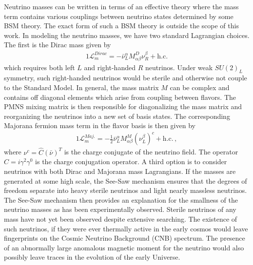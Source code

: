 \documentclass[universe,article,submit,moreauthors,pdftex,a4paper]{Definitions/mdpi}
\begin{document}
Neutrino masses can be written in terms of an effective theory where the mass term contains various couplings between neutrino states determined by some BSM theory. The exact form of such a BSM theory is outside the scope of this work. In modeling the neutrino masses, we have two standard Lagrangian choices. The first is the Dirac mass given by
\begin{alignat}{1}
	\label{DiracMass} \mathcal{L}_{m}^{Dirac} = -\bar{\nu}^{\alpha}_{L}M^{D}_{\alpha\beta}\nu^{\beta}_{R}+\mathrm{h.c.}
\end{alignat}
which requires both left $L$ and right-handed $R$ neutrinos. Under weak $SU(2)_{L}$ symmetry, such right-handed neutrinos would be sterile and otherwise not couple to the Standard Model. In general, the mass matrix $M$ can be complex and contains off diagonal elements which arise from coupling between flavors. The PMNS mixing matrix is then responsible for diagonalizing the mass matrix and reorganizing the neutrinos into a new set of basis states. The corresponding Majorana fermion mass term in the flavor basis is then given by
\begin{alignat}{1}
	\label{Majorana} \mathcal{L}_{m}^{Maj.} = -\frac{1}{2}\bar{\nu}^{\alpha}_{L}M^{M}_{\alpha\beta}(\nu^{\beta}_{L})^{c}+\mathrm{h.c.}\,,
\end{alignat}
where $\nu^{c} = \hat{C}(\bar{\nu})^{T}$ is the charge conjugate of the neutrino field. The operator $\hat{C} = i\gamma^{2}\gamma^{0}$ is the charge conjugation operator. A third option is to consider neutrinos with both Dirac and Majorana mass Lagrangians. If the masses are generated at some high scale, the See-Saw mechanism ensures that the degrees of freedom separate into heavy sterile neutrinos and light nearly massless neutrinos. The See-Saw mechanism then provides an explanation for the smallness of the neutrino masses as has been experimentally observed. Sterile neutrinos of any mass have not yet been observed despite extensive searching. The existence of such neutrinos, if they were ever thermally active in the early cosmos would leave fingerprints on the Cosmic Neutrino Background (CNB) spectrum. The presence of an abnormally large anomalous magnetic moment for the neutrino would also possibly leave traces in the evolution of the early Universe.
\end{document}
